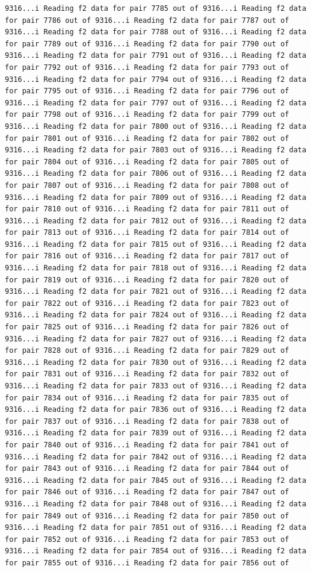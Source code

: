 \documentclass[
]{article}
\begin{document}
\begin{verbatim}
9316...i Reading f2 data for pair 7785 out of 9316...i Reading f2 data for pair 7786 out of 9316...i Reading f2 data for pair 7787 out of 9316...i Reading f2 data for pair 7788 out of 9316...i Reading f2 data for pair 7789 out of 9316...i Reading f2 data for pair 7790 out of 9316...i Reading f2 data for pair 7791 out of 9316...i Reading f2 data for pair 7792 out of 9316...i Reading f2 data for pair 7793 out of 9316...i Reading f2 data for pair 7794 out of 9316...i Reading f2 data for pair 7795 out of 9316...i Reading f2 data for pair 7796 out of 9316...i Reading f2 data for pair 7797 out of 9316...i Reading f2 data for pair 7798 out of 9316...i Reading f2 data for pair 7799 out of 9316...i Reading f2 data for pair 7800 out of 9316...i Reading f2 data for pair 7801 out of 9316...i Reading f2 data for pair 7802 out of 9316...i Reading f2 data for pair 7803 out of 9316...i Reading f2 data for pair 7804 out of 9316...i Reading f2 data for pair 7805 out of 9316...i Reading f2 data for pair 7806 out of 9316...i Reading f2 data for pair 7807 out of 9316...i Reading f2 data for pair 7808 out of 9316...i Reading f2 data for pair 7809 out of 9316...i Reading f2 data for pair 7810 out of 9316...i Reading f2 data for pair 7811 out of 9316...i Reading f2 data for pair 7812 out of 9316...i Reading f2 data for pair 7813 out of 9316...i Reading f2 data for pair 7814 out of 9316...i Reading f2 data for pair 7815 out of 9316...i Reading f2 data for pair 7816 out of 9316...i Reading f2 data for pair 7817 out of 9316...i Reading f2 data for pair 7818 out of 9316...i Reading f2 data for pair 7819 out of 9316...i Reading f2 data for pair 7820 out of 9316...i Reading f2 data for pair 7821 out of 9316...i Reading f2 data for pair 7822 out of 9316...i Reading f2 data for pair 7823 out of 9316...i Reading f2 data for pair 7824 out of 9316...i Reading f2 data for pair 7825 out of 9316...i Reading f2 data for pair 7826 out of 9316...i Reading f2 data for pair 7827 out of 9316...i Reading f2 data for pair 7828 out of 9316...i Reading f2 data for pair 7829 out of 9316...i Reading f2 data for pair 7830 out of 9316...i Reading f2 data for pair 7831 out of 9316...i Reading f2 data for pair 7832 out of 9316...i Reading f2 data for pair 7833 out of 9316...i Reading f2 data for pair 7834 out of 9316...i Reading f2 data for pair 7835 out of 9316...i Reading f2 data for pair 7836 out of 9316...i Reading f2 data for pair 7837 out of 9316...i Reading f2 data for pair 7838 out of 9316...i Reading f2 data for pair 7839 out of 9316...i Reading f2 data for pair 7840 out of 9316...i Reading f2 data for pair 7841 out of 9316...i Reading f2 data for pair 7842 out of 9316...i Reading f2 data for pair 7843 out of 9316...i Reading f2 data for pair 7844 out of 9316...i Reading f2 data for pair 7845 out of 9316...i Reading f2 data for pair 7846 out of 9316...i Reading f2 data for pair 7847 out of 9316...i Reading f2 data for pair 7848 out of 9316...i Reading f2 data for pair 7849 out of 9316...i Reading f2 data for pair 7850 out of 9316...i Reading f2 data for pair 7851 out of 9316...i Reading f2 data for pair 7852 out of 9316...i Reading f2 data for pair 7853 out of 9316...i Reading f2 data for pair 7854 out of 9316...i Reading f2 data for pair 7855 out of 9316...i Reading f2 data for pair 7856 out of 
\end{verbatim}
\end{document}

